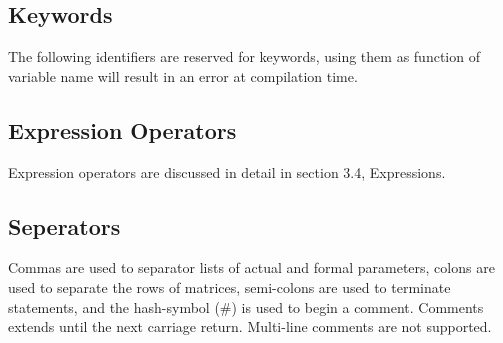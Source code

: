 \subsection{Keywords}
The following identifiers are reserved for keywords, using them as function of variable name will result in an error at compilation time.

\subsection{Expression Operators}
Expression operators are discussed in detail in section 3.4, Expressions.
\subsection{Seperators}
Commas are used to separator lists of actual and formal parameters, colons are used to separate the rows of matrices, semi-colons are used to terminate statements, and the hash-symbol (\#) is used to begin a comment. Comments extends until the next carriage return. Multi-line comments are not supported.
